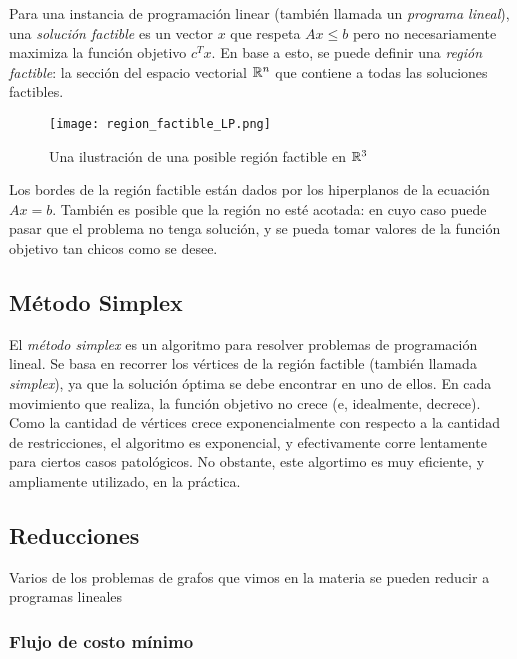Para una instancia de programación linear (también llamada un \textit{programa lineal}), una \textit{solución factible} es un vector $x$ que respeta $Ax \leq b$ pero no necesariamente maximiza la función objetivo $c^T x$. En base a esto, se puede definir una \textit{región factible}: la sección del espacio vectorial $\mathbb{R}^n$ que contiene a todas las soluciones factibles.

\begin{figure}
    \centering
    \texttt{[image: region\_factible\_LP.png]}
    \caption*{Una ilustración de una posible región factible en $\mathbb{R}^3$}
\end{figure}

Los bordes de la región factible están dados por los hiperplanos de la ecuación $Ax = b$. También es posible que la región no esté acotada: en cuyo caso puede pasar que el problema no tenga solución, y se pueda tomar valores de la función objetivo tan chicos como se desee.

\subsection{Método Simplex}

El \textit{método simplex} es un algoritmo para resolver problemas de programación lineal. Se basa en recorrer los vértices de la región factible (también llamada \textit{simplex}), ya que la solución óptima se debe encontrar en uno de ellos. En cada movimiento que realiza, la función objetivo no crece (e, idealmente, decrece). Como la cantidad de vértices crece exponencialmente con respecto a la cantidad de restricciones, el algoritmo es exponencial, y efectivamente corre lentamente para ciertos casos patológicos. No obstante, este algortimo es muy eficiente, y ampliamente utilizado, en la práctica.

\subsection{Reducciones}

Varios de los problemas de grafos que vimos en la materia se pueden reducir a programas lineales

\subsubsection{Flujo de costo mínimo}

